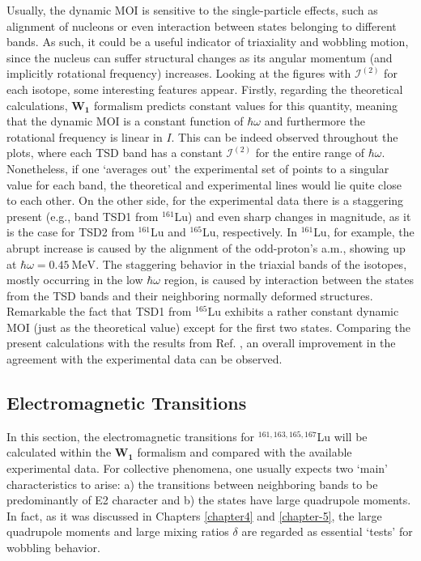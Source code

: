 Usually, the dynamic MOI is sensitive to the single-particle effects, such as alignment of nucleons or even interaction between states belonging to different bands. As such, it could be a useful indicator of triaxiality and wobbling motion, since the nucleus can suffer structural changes as its angular momentum (and implicitly rotational frequency) increases. Looking at the figures with $\mathcal{I}^{(2)}$ for each isotope, some interesting features appear. Firstly, regarding the theoretical calculations, $\mathbf{W_1}$ formalism predicts constant values for this quantity, meaning that the dynamic MOI is a constant function of $\hbar\omega$ and furthermore the rotational frequency is linear in $I$. This can be indeed observed throughout the plots, where each TSD band has a constant $\mathcal{I}^{(2)}$ for the entire range of $\hbar\omega$. Nonetheless, if one `averages out' the experimental set of points to a singular value for each band, the theoretical and experimental lines would lie quite close to each other. On the other side, for the experimental data there is a staggering present (e.g., band TSD1 from $^{161}$Lu) and even sharp changes in magnitude, as it is the case for TSD2 from $^{161}$Lu and $^{165}$Lu, respectively. In $^{161}$Lu, for example, the abrupt increase is caused by the alignment of the odd-proton's a.m., showing up at $\hbar\omega=0.45\ \text{MeV}$. The staggering behavior in the triaxial bands of the isotopes, mostly occurring in the low $\hbar\omega$ region, is caused by interaction between the states from the TSD bands and their neighboring normally deformed structures. Remarkable the fact that TSD1 from $^{165}$Lu exhibits a rather constant dynamic MOI (just as the  theoretical value) except for the first two states. Comparing the present calculations with the results from Ref. \cite{raduta2018wobbling}, an overall improvement in the agreement with the experimental data can be observed.

\subsection{Electromagnetic Transitions}

In this section, the electromagnetic transitions for $^{161,163,165,167}$Lu will be calculated within the $\mathbf{W_1}$ formalism and compared with the available experimental data. For collective phenomena, one usually expects two `main' characteristics to arise: a) the transitions between neighboring bands to be predominantly of E2 character and b) the states have large quadrupole moments. In fact, as it was discussed in Chapters \ref{chapter4} and \ref{chapter-5}, the large quadrupole moments and large mixing ratios $\delta$ are regarded as essential `tests' for wobbling behavior.

